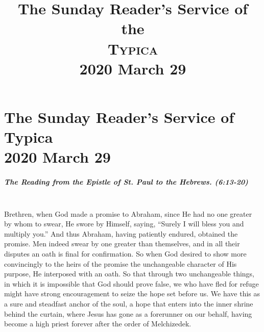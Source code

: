 \documentclass[twoside, letterpaper, 12pt]{report}
\title{The Sunday Reader's Service of the \\ \textsc{Typica} \\  2020 March 29}
\date{}
\author{}
\begin{document}
\maketitle
\pagestyle{empty} %
\cleardoublepage
\pagestyle{plain}
\setcounter{page}{1} %
\chapter*{The Sunday Reader's Service of Typica\\ 2020 March 29}

\trisagionNeedsAmen[reader]







\paragraph{The Reading from the Epistle of St. Paul to the Hebrews. (6:13-20)}\mbox{}\\

Brethren, when God made a promise to Abraham, since He had no one greater by whom
to swear, He swore by Himself, saying, “Surely I will bless you and multiply you.” And thus
Abraham, having patiently endured, obtained the promise. Men indeed swear by one greater than
themselves, and in all their disputes an oath is final for confirmation. So when God desired to show
more convincingly to the heirs of the promise the unchangeable character of His purpose, He
interposed with an oath. So that through two unchangeable things, in which it is impossible that
God should prove false, we who have fled for refuge might have strong encouragement to seize
the hope set before us. We have this as a sure and steadfast anchor of the soul, a hope that enters
into the inner shrine behind the curtain, where Jesus has gone as a forerunner on our behalf, having
become a high priest forever after the order of Melchizedek.
\end{document}
